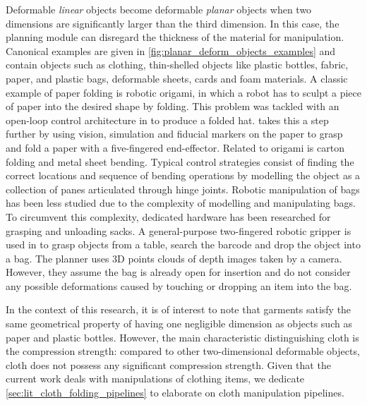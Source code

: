 Deformable \textit{linear} objects become deformable \textit{planar} objects when two dimensions are significantly larger than the third dimension. 
In this case, the planning module can disregard the thickness of the material for manipulation. Canonical examples are given in \cref{fig:planar_deform_objects_examples} and contain objects such as clothing, thin-shelled objects like plastic bottles, fabric, paper, and plastic bags, deformable sheets, cards and foam materials. A classic example of paper folding is robotic origami, in which a robot has to sculpt a piece of paper into the desired shape by folding. This problem was tackled with an open-loop control architecture in \autocite{Balkcom2008} to produce a folded hat. \Textcite{Elbrechter2012} takes this a step further by using vision, simulation and fiducial markers on the paper to grasp and fold a paper with a five-fingered end-effector. Related to origami is carton folding and metal sheet bending. Typical control strategies \autocite{Liang1999,Liu2003,Aomura2002} consist of finding the correct locations and sequence of bending operations by modelling the object as a collection of panes articulated through hinge joints. Robotic manipulation of bags has been less studied due to the complexity of modelling and manipulating bags. To circumvent this complexity, dedicated hardware has been researched for grasping \autocite{Kazerooni2005} and unloading \autocite{Kirchheim2008} sacks. A general-purpose two-fingered robotic gripper is used in \autocite{Klingbeil2011} to grasp objects from a table, search the barcode and drop the object into a bag. The planner uses 3D points clouds of depth images taken by a camera. However, they assume the bag is already open for insertion and do not consider any possible deformations caused by touching or dropping an item into the bag.

In the context of this research, it is of interest to note that garments satisfy the same geometrical property of having one negligible dimension as objects such as paper and plastic bottles. However, the main characteristic distinguishing cloth is the compression strength: compared to other two-dimensional deformable objects, cloth does not possess any significant compression strength. Given that the current work deals with manipulations of clothing items, we dedicate \cref{sec:lit_cloth_folding_pipelines} to elaborate on cloth manipulation pipelines.

